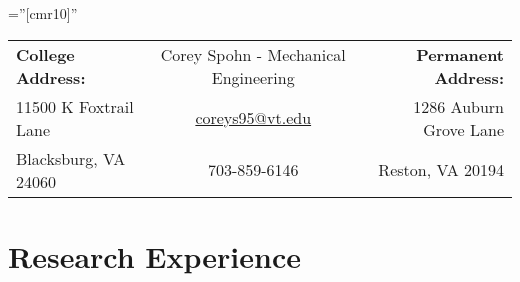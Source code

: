 \documentclass[a4paper]{article}
\begin{document}
\pagestyle{empty} %

\font\fb=''[cmr10]'' %


\begin{center}
\setlength{\tabcolsep}{12pt}
\begin{tabular}{l  c  r} 
\footnotesize{\textbf{College Address:}}& \large Corey Spohn - Mechanical Engineering & \footnotesize{\textbf{Permanent Address:}}\\[-0.5ex]
\footnotesize{11500 K Foxtrail Lane}&\href{mailto:coreys95@vt.edu}{coreys95@vt.edu}&\footnotesize{1286 Auburn Grove Lane}\\[-0.75ex]
\footnotesize{Blacksburg, VA 24060}&\footnotesize{703-859-6146}&\footnotesize{Reston, VA 20194}\\[-0.5ex]
\bottomrule[1mm]
\end{tabular}

\end{center}


\section{Research Experience}
\end{document}
